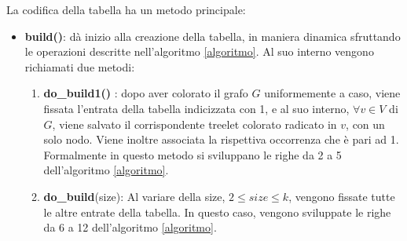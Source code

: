 La codifica della tabella ha un metodo principale:
\begin{itemize}
	\item \textbf{build()}: d\`a inizio alla creazione della tabella, in maniera dinamica sfruttando le operazioni descritte nell'algoritmo \ref{algoritmo}.
	Al suo interno vengono richiamati due metodi:
	\begin{enumerate}
		\item \textbf{do\_build1()} : dopo aver colorato il grafo $ G $ uniformemente a caso, viene fissata l'entrata della tabella indicizzata con 1, e al suo interno, $ \forall v \in V $ di $ G $, viene salvato il corrispondente treelet  colorato radicato in $ v $, con un solo nodo.
		Viene inoltre associata la rispettiva occorrenza che \`e pari ad 1.
		Formalmente in questo metodo si sviluppano le righe da 2 a 5 dell'algoritmo \ref{algoritmo}.	
		\item \textbf{do\_build}(size): Al variare della size, $ 2\le size \le k $, vengono fissate tutte le altre entrate della tabella.
	 	In questo caso, vengono sviluppate le righe da 6 a 12 dell'algoritmo \ref{algoritmo}.
	\end{enumerate}
\end{itemize}	


	
